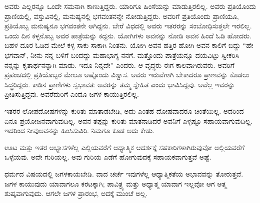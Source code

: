 ಅವರು ಎಲ್ಲರನ್ನೂ ಒಂದೇ ಸಮನಾಗಿ ಕಾಣುತ್ತಿದ್ದರು. ಯಾರಿಗೂ ಹಿಂಸೆಯನ್ನು ಮಾಡುತ್ತಿರಲಿಲ್ಲ. ಅವರು ಪ್ರತಿಯೊಂದು ಪ್ರಾಣಿಯಲ್ಲಿ, ವಸ್ತುವಿನಲ್ಲಿ, ಮನುಷ್ಯನಲ್ಲಿ ಭಗವಂತನನ್ನೇ ನೋಡುತ್ತಿದ್ದರು. ಅವರಿಗೆ ಪ್ರತಿಯೊಂದು ಪ್ರಾಣಿಯೂ, ಪ್ರತಿಯೊಬ್ಬ ಮನುಷ್ಯನೂ ಭಗವಂತನೇ ಆಗಿದ್ದನು. ಬೇರೆ ವಿಧದಲ್ಲಿ ಅವರು ಇತರರನ್ನು ಸಂಬೋಧಿಸುತ್ತಲೇ ಇರಲಿಲ್ಲ. ಒಂದು ದಿನ ಕಳ್ಳನೊಬ್ಬ ಅವರ ಪಾತ್ರೆಯನ್ನು ಕದ್ದನು. ಯೋಗಿಗಳು ಅವನನ್ನು ನೋಡಿ ಅವನ ಹಿಂದೆ ಓಡಿ ಹೋದರು. ಬಹಳ ದೂರ ಓಡಿದ ಮೇಲೆ ಕಳ್ಳ ಸಾಕು ಸಾಕಾಗಿ ನಿಂತನು. ಯೋಗಿ ಅವನ ಹತ್ತಿರ ಹೋಗಿ ಅವನ ಕಾಲಿಗೆ ಬಿದ್ದು “ಹೇ ಭಗವಾನ್​, ನೀನು ನನ್ನ ಬಳಿಗೆ ಬಂದದ್ದು ಮಹಾಭಾಗ್ಯ ನನಗೆ. ಮತ್ತೊಂದು ಪಾತ್ರೆಯನ್ನೂ ದಯವಿಟ್ಟು ಸ್ವೀಕರಿಸಿ ನನ್ನನ್ನು ಕೃತಾರ್ಥನನ್ನಾಗಿ ಮಾಡು. ಇದೂ ನಿನ್ನದೇ” ಎಂದರು. ಆ ವೃದ್ಧರು ಈಗ ಕಾಲವಾಗಿರುವರು. ಅವರಿಗೆ ಪ್ರಪಂಚದಲ್ಲಿ ಪ್ರತಿಯೊಬ್ಬರ ಮೇಲೂ ಅಷ್ಟೊಂದು ವಿಶ್ವಾಸ. ಅವರು ಇರುವೆಗಾಗಿ ಬೇಕಾದರೂ ಪ್ರಾಣವನ್ನು ಕೊಡಲು ಸಿದ್ಧರಿದ್ದರು. ಕಾಡಿನ ಪ್ರಾಣಿಗಳು ಸ್ವಭಾವತಃ ಅವರನ್ನು ತಮ್ಮ ಸ್ನೇಹಿತ ಎಂದು ಭಾವಿಸಿದ್ದವು. ಅವೆಲ್ಲ ಇವರನ್ನು ಪ್ರೀತಿಸುತ್ತಿದ್ದವು. ಅವರೆದುರಿಗೆ ಎಂದೂ ಜಗಳ ಕಾಯುತ್ತಿರಲಿಲ್ಲ.

ಇತರರ ಲೋಪದೋಷಗಳನ್ನು ಕುರಿತು ಮಾತಾಡಬೇಡಿ, ಅದು ಎಂತಹ ದೋಷವಾದರೂ ಚಿಂತೆಯಿಲ್ಲ. ಅದರಿಂದ ಏನೂ ಪ್ರಯೋಜನವಾಗುವುದಿಲ್ಲ. ಅವನ ತಪ್ಪನ್ನು ಕುರಿತು ಮಾತನಾಡಿದರೆ ಅವನಿಗೆ ಎಳ್ಳಷ್ಟೂ ಸಹಾಯವಾಗುವುದಿಲ್ಲ. ಇದರಿಂದ ನೀವು\break ಅವನನ್ನು ಹಿಂಸಿಸುವಿರಿ. ನಿಮಗೂ ಕೂಡ ಅದು ಕೇಡು.

ಊಟ ಮತ್ತು ಇತರ ಅಭ್ಯಾಸಗಳೆಲ್ಲ ಎಲ್ಲಿಯವರೆಗೆ ಆಧ್ಯಾತ್ಮಿಕ ಆದರ್ಶಕ್ಕೆ ಸಹಕಾರಿಗಳಾ\-ಗಿರುವುವೋ ಅಲ್ಲಿಯವರೆಗೆ ಒಳ್ಳೆಯವು. ಅವೇ ಗುರಿಯಲ್ಲ. ಅವು ಗುರಿಯ ಎಡೆಗೆ ಹೋಗುವುದಕ್ಕೆ ಸಹಾಯಕವಾಗುತ್ತವೆ ಅಷ್ಟೆ.

ಧರ್ಮದ ವಿಷಯದಲ್ಲಿ ಜಗಳಕಾಯಬೇಡಿ. ವಾದ ಚರ್ಚೆ ಇವುಗಳೆಲ್ಲ ಆಧ್ಯಾತ್ಮಿಕತೆಯ ಅಭಾವವನ್ನು ತೋರುತ್ತವೆ. ಜಗಳ ಕಾಯುವುದು ಯಾವಾಗಲೂ ಕರಟಕ್ಕಾಗಿ; ಪಾವಿತ್ರ್ಯ ಮತ್ತು ಅಧ್ಯಾತ್ಮ ಯಾವಾಗ ಇಲ್ಲವೋ ಆಗ ಆತ್ಮ ಶುಷ್ಕವಾಗುವುದು. ಆಗಲೇ ಜಗಳ ಪ್ರಾರಂಭ, ಅದಕ್ಕೆ ಮುಂಚೆ ಅಲ್ಲ.


